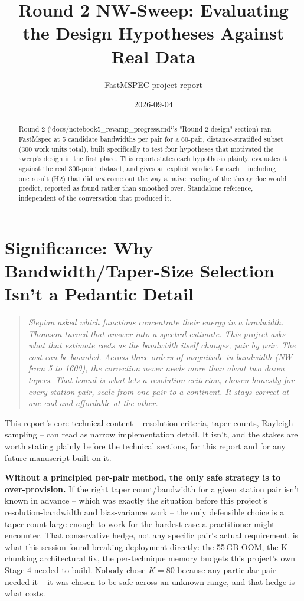 \documentclass[11pt]{article}
\title{Round 2 NW-Sweep: Evaluating the Design Hypotheses Against Real Data}
\author{FastMSPEC project report}
\date{2026-09-04}
\begin{document}
\maketitle

\begin{abstract}
Round 2 (`docs/notebook5\_revamp\_progress.md`'s "Round 2 design" section) ran FastMspec at 5
candidate bandwidths per pair for a 60-pair, distance-stratified subset (300 work units total),
built specifically to test four hypotheses that motivated the sweep's design in the first place.
This report states each hypothesis plainly, evaluates it against the real 300-point dataset, and
gives an explicit verdict for each -- including one result (H2) that did \emph{not} come out the
way a naive reading of the theory doc would predict, reported as found rather than smoothed over.
Standalone reference, independent of the conversation that produced it.
\end{abstract}

\tableofcontents

\section{Significance: Why Bandwidth/Taper-Size Selection Isn't a Pedantic Detail}
\label{sec:significance}

\begin{quote}
\emph{Slepian asked which functions concentrate their energy in a bandwidth. Thomson turned that
answer into a spectral estimate. This project asks what that estimate costs as the bandwidth
itself changes, pair by pair. The cost can be bounded. Across three orders of magnitude in
bandwidth ($NW$ from 5 to 1600), the correction never needs more than about two dozen tapers.
That bound is what lets a resolution criterion, chosen honestly for every station pair, scale
from one pair to a continent. It stays correct at one end and affordable at the other.}
\end{quote}

This report's core technical content -- resolution criteria, taper counts, Rayleigh sampling --
can read as narrow implementation detail. It isn't, and the stakes are worth stating plainly
before the technical sections, for this report and for any future manuscript built on it.

\textbf{Without a principled per-pair method, the only safe strategy is to over-provision.} If
the right taper count/bandwidth for a given station pair isn't known in advance -- which was
exactly the situation before this project's resolution-bandwidth and bias-variance work -- the
only defensible choice is a taper count large enough to work for the hardest case a practitioner
might encounter. That conservative hedge, not any specific pair's actual requirement, is what
this session found breaking deployment directly: the 55\,GB OOM, the K-chunking architectural
fix, the per-technique memory budgets this project's own Stage 4 needed to build. Nobody chose
$K=80$ because any particular pair needed it -- it was chosen to be safe across an unknown range,
and that hedge is what costs.
\end{document}
